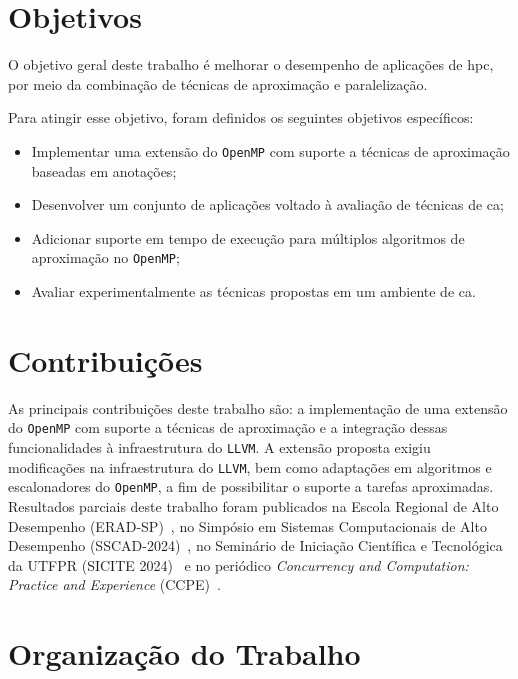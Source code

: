\section{Objetivos}\label{cap:objetivos}

O objetivo geral deste trabalho é melhorar o desempenho de aplicações de \gls{hpc}, por meio da combinação de técnicas de aproximação e paralelização.

Para atingir esse objetivo, foram definidos os seguintes objetivos específicos:
\begin{itemize}
    \item Implementar uma extensão do \texttt{OpenMP} com suporte a técnicas de aproximação baseadas em anotações;
    \item Desenvolver um conjunto de aplicações voltado à avaliação de técnicas de \gls{ca};
    \item Adicionar suporte em tempo de execução para múltiplos algoritmos de aproximação no \texttt{OpenMP};
    \item Avaliar experimentalmente as técnicas propostas em um ambiente de \gls{ca}.
\end{itemize}

\section{Contribuições}\label{cap:contribuicoes}

As principais contribuições deste trabalho são: a implementação de uma extensão do \texttt{OpenMP} com suporte a técnicas de aproximação e a integração dessas funcionalidades à infraestrutura do \texttt{LLVM}. A extensão proposta exigiu modificações na infraestrutura do \texttt{LLVM}, bem como adaptações em algoritmos e escalonadores do \texttt{OpenMP}, a fim de possibilitar o suporte a tarefas aproximadas. Resultados parciais deste trabalho foram publicados na Escola Regional de Alto Desempenho (ERAD-SP)~\cite{oliveira2024a}, no Simpósio em Sistemas Computacionais de Alto Desempenho (SSCAD-2024)~\cite{oliveira2024b}, no Seminário de Iniciação Científica e Tecnológica da UTFPR (SICITE 2024)~\cite{oliveira2024c} e no periódico \textit{Concurrency and Computation: Practice and Experience} (CCPE)~\cite{oliveira2026}.

\section{Organização do Trabalho}\label{cap:org_trabalho}

